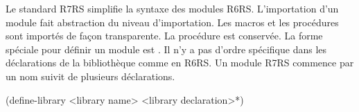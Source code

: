 




Le standard R7RS\cite{Scheme:R7RS} simplifie la syntaxe des modules
R6RS\cite{Scheme:R6RS}.  L'importation d'un module fait abstraction du niveau
d'importation. Les macros et les procédures sont importés de façon
transparente. La procédure  est conservée. La forme spéciale pour
définir un module est . Il n'y a pas d'ordre spécifique
dans les déclarations de la bibliothèque comme en R6RS. Un module R7RS commence par
un nom suivit de plusieurs déclarations.\\
\begin{center}
  \begin{mplisting}{0.5}
(define-library <library name>
  <library declaration>*)
\end{mplisting}
\end{center}

